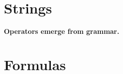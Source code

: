 \chapter{Strings}






\begin{center}
    \textbf{Operators emerge from grammar.}
\end{center}



\chapter{Formulas}

